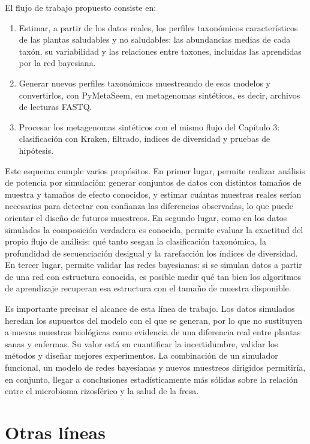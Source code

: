 El flujo de trabajo propuesto consiste en:
\begin{enumerate}
    \item Estimar, a partir de los datos reales, los perfiles taxonómicos característicos de las
    plantas saludables y no saludables: las abundancias medias de cada taxón, su variabilidad y
    las relaciones entre taxones, incluidas las aprendidas por la red bayesiana.
    \item Generar nuevos perfiles taxonómicos muestreando de esos modelos y convertirlos, con
    PyMetaSeem, en metagenomas sintéticos, es decir, archivos de lecturas FASTQ.
    \item Procesar los metagenomas sintéticos con el mismo flujo del Capítulo 3: clasificación con
    Kraken, filtrado, índices de diversidad y pruebas de hipótesis.
\end{enumerate}

Este esquema cumple varios propósitos. En primer lugar, permite realizar análisis de potencia por
simulación: generar conjuntos de datos con distintos tamaños de muestra y tamaños de efecto
conocidos, y estimar cuántas muestras reales serían necesarias para detectar con confianza las
diferencias observadas, lo que puede orientar el diseño de futuros muestreos. En segundo lugar,
como en los datos simulados la composición verdadera es conocida, permite evaluar la exactitud del
propio flujo de análisis: qué tanto sesgan la clasificación taxonómica, la profundidad de
secuenciación desigual y la rarefacción los índices de diversidad. En tercer lugar, permite
validar las redes bayesianas: si se simulan datos a partir de una red con estructura conocida, es
posible medir qué tan bien los algoritmos de aprendizaje recuperan esa estructura con el tamaño de
muestra disponible.

Es importante precisar el alcance de esta línea de trabajo. Los datos simulados heredan los
supuestos del modelo con el que se generan, por lo que no sustituyen a nuevas muestras biológicas
como evidencia de una diferencia real entre plantas sanas y enfermas. Su valor está en cuantificar
la incertidumbre, validar los métodos y diseñar mejores experimentos. La combinación de un
simulador funcional, un modelo de redes bayesianas y nuevos muestreos dirigidos permitiría, en
conjunto, llegar a conclusiones estadísticamente más sólidas sobre la relación entre el microbioma
rizosférico y la salud de la fresa.

\section{Otras líneas}

